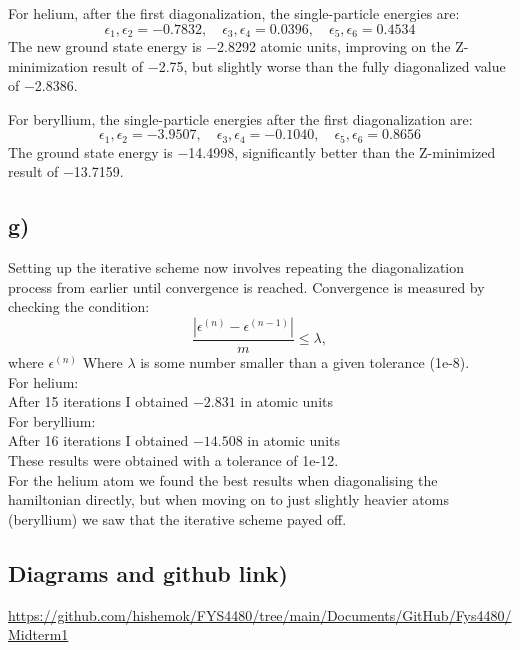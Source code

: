 \documentclass[a4paper,12pt]{article}
\begin{document}
For helium, after the first diagonalization, the single-particle energies are:
\[
ϵ _1, ϵ _2 = -0.7832, \quad ϵ _3, ϵ _4 = 0.0396, \quad ϵ _5 ,ϵ _6 = 0.4534
\]
The new ground state energy is −2.8292 atomic units, improving on the Z-minimization result of −2.75, but slightly worse than the fully diagonalized value of −2.8386.

For beryllium, the single-particle energies after the first diagonalization are:
\[
ϵ _1 , ϵ _2 = -3.9507, \quad ϵ _3 , ϵ _4 = -0.1040, \quad ϵ _5 , ϵ _6 = 0.8656 
\]
The ground state energy is −14.4998, significantly better than the Z-minimized result of −13.7159.


\subsection*{g)}
Setting up the iterative scheme now involves repeating the diagonalization process from earlier until convergence is reached. Convergence is measured by checking the condition:
\[
\frac{|ϵ ^{(n)} - ϵ ^{(n-1)}|}{m} \leq \lambda,
\]
where $ϵ ^{(n)}$ 
Where $λ$ is some number smaller than a given tolerance (1e-8).\\
For helium:\\
After 15 iterations I obtained $-2.831$ in atomic units\\
For beryllium:\\
After 16 iterations I obtained $-14.508$ in atomic units\\
These results were obtained with a tolerance of 1e-12.\\
For the helium atom we found the best results when diagonalising the  hamiltonian directly, but when moving on to just slightly heavier atoms (beryllium) we saw that the iterative scheme payed off.\\



\subsection*{Diagrams and github link)}


\url{https://github.com/hishemok/FYS4480/tree/main/Documents/GitHub/Fys4480/Midterm1}
\newpage

\newpage
\label{fig:pdf_image_page1}

\newpage
\label{fig:pdf_image_page2}
\end{document}
